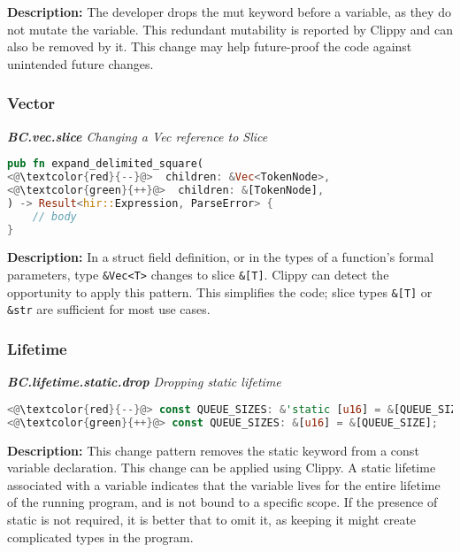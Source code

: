 \noindent\textbf{Description:} The developer drops the mut keyword before a variable, as they do not mutate the variable. This redundant mutability is reported by Clippy and can also be removed by it. This change may help future-proof the code against unintended future changes.

\subsubsection{Vector}

\noindent\textit{\textbf{BC.vec.slice} Changing a Vec reference to Slice}

\begin{lstlisting}[language=Rust, style=colouredRust]
pub fn expand_delimited_square(
<@\textcolor{red}{--}@>  children: &Vec<TokenNode>,
<@\textcolor{green}{++}@>  children: &[TokenNode],
) -> Result<hir::Expression, ParseError> {
    // body
}
\end{lstlisting}
\noindent\textbf{Description:} In a struct field definition, or in the types of a function's formal parameters, type \verb+&Vec<T>+ changes to slice \verb+&[T]+. Clippy can detect the opportunity to apply this pattern. This simplifies the code; slice types \verb+&[T]+ or \verb+&str+ are sufficient for most use cases. 

\subsubsection{Lifetime}
\noindent\textit{\textbf{BC.lifetime.static.drop} Dropping static lifetime}

\begin{lstlisting}[language=Rust, style=colouredRust]
<@\textcolor{red}{--}@> const QUEUE_SIZES: &'static [u16] = &[QUEUE_SIZE];
<@\textcolor{green}{++}@> const QUEUE_SIZES: &[u16] = &[QUEUE_SIZE];

\end{lstlisting}

\noindent\textbf{Description:} This change pattern removes the static keyword from a const variable declaration. This change can be applied using Clippy. A static lifetime associated with a variable indicates that the variable lives for the entire lifetime of the running program, and is not bound to a specific scope. If the presence of static is not required, it is better that to omit it, as keeping it might create complicated types in the program.

